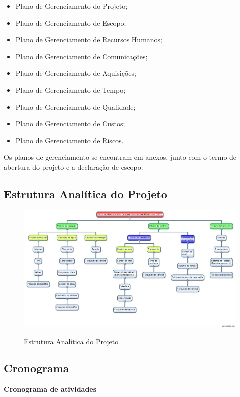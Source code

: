   \begin{itemize}
  \item Plano de Gerenciamento do Projeto;
  \item Plano de Gerenciamento de Escopo;
  \item Plano de Gerenciamento de Recursos Humanos;
  \item Plano de Gerenciamento de Comunicações;
  \item Plano de Gerenciamento de Aquisições;
  \item Plano de Gerenciamento de Tempo;
  \item Plano de Gerenciamento de Qualidade;
  \item Plano de Gerenciamento de Custos;
  \item Plano de Gerenciamento de Riscos.
  \end{itemize}
  
  Os planos de gerenciamento se encontram em anexos, junto com o termo de abertura do projeto e a declaração de escopo.
  
  \subsection{Estrutura Analítica do Projeto}
      
   \begin{figure}[!h]
    \centering
    \includegraphics[scale = 0.2]{editaveis/figuras/EAP}
    \label{EAP}
    \caption{Estrutura Analítica do Projeto}
   \end{figure}
   \FloatBarrier
   
  \subsection{Cronograma}
   
   \textbf{Cronograma de atividades}
   
